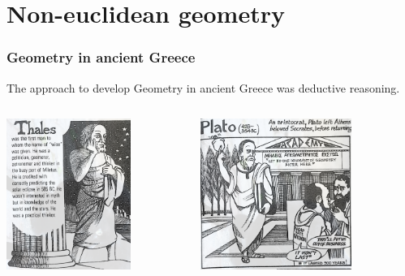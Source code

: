 \documentclass[unicode, 14pt, aspectratio=169]{beamer}
\begin{document}
\section{Non-euclidean geometry}
\begin{frame}
  \frametitle{Geometry in ancient Greece}
  {\large The approach to develop Geometry in ancient Greece was deductive reasoning.}
\begin{columns}
  \begin{column}{0.25\textwidth}
    \begin{center}
      \includegraphics[width=0.7\textwidth]{images/thales.png}
    \end{center}
  \end{column}
  \begin{column}{0.25\textwidth}
    \begin{center}
      \includegraphics[width=0.7\textwidth]{images/plato.png}

\end{center}
\end{column}
\end{columns}
\end{frame}
\end{document}
